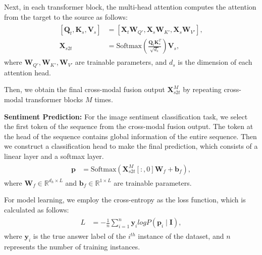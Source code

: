Next, in each transformer block, the multi-head attention computes the attention from the target to the source as follows:
\begin{eqnarray}
\begin{aligned}
[\bm{Q}_t, \bm{K}_s, \bm{V}_s] &= [\bm{X}_t \bm{W}_{Q'}, \bm{X}_s \bm{W}_{K'}, \bm{X}_s \bm{W}_{V'}],\\
\bm{X}_{s2t} &= \text{Softmax}\left(\frac{\bm{Q}_t \bm{K}_s^T}{\sqrt{d_s}}\right) \bm{V}_s,
% 
\end{aligned}
\end{eqnarray}
where \( \bm{W}_{Q'}, \bm{W}_{K'}, \bm{W}_{V'}\) are trainable parameters, and \( d_s \) is the dimension of each attention head. 

Then, we obtain the final cross-modal fusion output $\bm{X}_{s2t}^M$ by repeating cross-modal transformer blocks $M$ times.

\textbf{Sentiment Prediction:}
For the image sentiment classification task, we select the first token of the sequence from the cross-modal fusion output. The token at the head of the sequence contains global information of the entire sequence. 
Then we construct a classification head to make the final prediction, which consists of a linear layer and a softmax layer.
\begin{eqnarray}
\begin{aligned}
\bm{p} &= \text{Softmax}(\bm{X}_{s2t}^M[:, 0] \bm{W}_f + \bm{b}_f),
\end{aligned}
\end{eqnarray}
where $\bm{W}_f \in \mathbb{R}^{d_h \times L}$ and $\bm{b}_f \in \mathbb{R}^{1 \times L}$ are trainable parameters.

For model learning, we employ the cross-entropy as the loss
function, which is calculated as follows:
\begin{eqnarray}
\begin{aligned}
L &= -\frac{1}{n} \sum_{i = 1}^{n} \boldsymbol{y}_{i} log P(\boldsymbol{p}_{i} \mid \boldsymbol{I}),
\end{aligned}
\end{eqnarray}
where $\boldsymbol{y}_i$ is the true answer label of the $i^{th}$ instance of the dataset, and $n$ represents the number of training instances.

